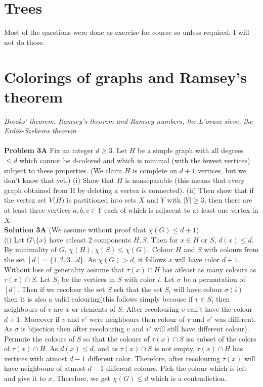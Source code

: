 \documentclass{book}
\begin{document}
 \chapter{Trees}
 Most of the questions were done as exercise for course so unless required, I will not do those.


 \chapter{ Colorings of graphs and Ramsey's theorem}
 \textit{Brooks' theorem, Ramsey's theorem and Ramsey
 numbers, the L'ovasz sieve, the Erd\"os-Szekeres
 theorem}\\\\
\textbf{Problem 3A} Fix an integer $d \geq 3$. Let 
$H$ be a simple graph with
all degrees $\leq d$ which cannot be $d$-colored and which is minimal
(with the fewest vertices) subject to these properties. (We claim $H$
is complete on $d+ 1$ vertices, but we don't know that yet.) (i) Show
that $H$ is nonseparable (this means that every graph obtained from
H by deleting a vertex is connected). (ii) Then show that if the
vertex set $V(H$) is partitioned into sets $X$ and $Y$ with $|Y | \geq 3$,
then there are at least three vertices $a, b, c \in Y$ each of which is
adjacent to at least one vertex in $X$. \\
\textbf{Solution 3A} (We assume without proof that $\chi(G)\leq d+1$)\\
(i) Let $G\setminus\{x\}$ have atleast 2 components $H,S$. Then for $x\in H$ or $S$, $d(x)\leq d$. By minimality of $G$, $\chi(H),\chi(S)\leq \chi(G)$. Colour $H$ and $S$ with colours from  the set $[d]=\{1,2,3\hdots d\}$. As $\chi(G)>d$, it follows $x$ will have color $d+1$. Without loss of generality assume that $\tau(x)\cap H$ has atleast as many colours as $\tau(x)\cap S$. Let $S_i$ be the vertices in $S$ with color $i$. Let $\sigma$ be a permutation of $[d]$. Then if we recolour the set $S$ sch that the set $S_i$ will have colour $\sigma(i)$ then it is also a valid colouring(this follows simply because if $v\in S_i$ then neighbours of $v$ are $x$ or elements of $S$. After recolouring $v$ can't have the colour $d+1$. Moreover if $v$ and $v'$ were neighbours then colour of $v$ and $v'$ was different. As $\sigma$ is bijection then after recolouring $v$ and $v'$ will still have different colour). Permute the colours of $S$ so that the colours of  $\tau(x)\cap S$ isa subset of the colors of $\tau(x)\cap H$. As $d(x)\leq d$, and as $\tau(x)\cap S$ is not empty, $\tau(x)\cap H$ has vertices with atmost $d-1$ different color. Therefore, after recolouring $\tau(x)$ will have neighbours of atmost $d-1$ different colours. Pick the colour which is left and give it to $x$. Therefore, we get $\chi(G)\leq d$ which is a contradiction. 
\end{document}
